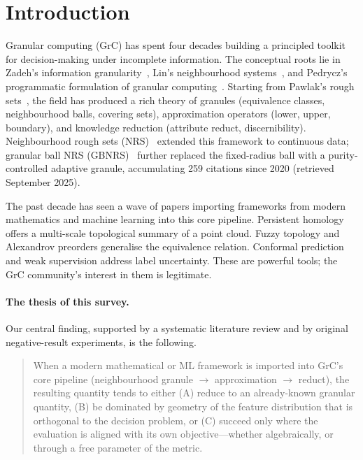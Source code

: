 \section{Introduction}
\label{sec:intro}

Granular computing (GrC) has spent four decades building a principled
toolkit for decision-making under incomplete information.  The conceptual
roots lie in Zadeh's information granularity~\cite{Zadeh1979granularity},
Lin's neighbourhood systems~\cite{Lin1998neighborhood}, and Pedrycz's
programmatic formulation of granular
computing~\cite{Pedrycz2001GrC}.  Starting from
Pawlak's rough sets~\cite{Pawlak1982}, the field has produced a rich theory
of granules (equivalence classes, neighbourhood balls, covering sets),
approximation operators (lower, upper, boundary), and knowledge reduction
(attribute reduct, discernibility).  Neighbourhood rough sets
(NRS)~\cite{Hu2008NRS} extended this framework to continuous data;
granular ball NRS (GBNRS)~\cite{Xia2020GBNRS} further replaced the
fixed-radius ball with a purity-controlled adaptive granule, accumulating
259 citations since 2020 (retrieved September 2025).

The past decade has seen a wave of papers importing frameworks from modern
mathematics and machine learning into this core pipeline.  Persistent
homology offers a multi-scale topological summary of a point cloud.
Fuzzy topology and Alexandrov preorders generalise the equivalence
relation.  Conformal prediction and weak supervision address label
uncertainty.  These are powerful tools; the GrC community's interest in
them is legitimate.

\paragraph{The thesis of this survey.}
Our central finding, supported by a systematic literature review and by
original negative-result experiments, is the following.

\begin{quote}
When a modern mathematical or ML framework is imported into GrC's core
pipeline (neighbourhood granule $\to$ approximation $\to$ reduct), the
resulting quantity tends to either (A) reduce to an already-known
granular quantity, (B) be dominated by geometry of the feature distribution
that is orthogonal to the decision problem, or (C) succeed only where the
evaluation
is aligned with its own objective---whether algebraically, or through a free
parameter of the metric.
\end{quote}

